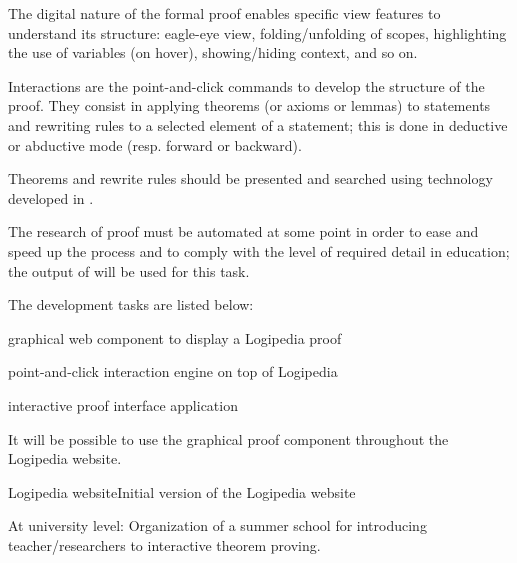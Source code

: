 \begin{workpackage}[id=dissemination,wphases=0-48,type=MGT,
  short=Dissemination,%
  title={Dissemination, communication and exploitation},
  lead=Inr]
\begin{tasklist}
\begin{task}[id=edukera,
      title=Web interface for doing proofs at school,
      lead=Edu,EduRM=12]
      The digital nature of the formal proof enables specific view features to
      understand its structure: eagle-eye view, folding/unfolding of scopes,
      highlighting the use of variables (on hover), showing/hiding context,
      and so on.

      Interactions are the point-and-click commands to develop the structure
      of the proof. They consist in applying theorems (or axioms or lemmas)
      to statements and rewriting rules to a selected element of a statement;
      this is done in deductive or abductive mode (resp. forward or backward).

      Theorems and rewrite rules should be presented and searched using
      technology developed in .

      The research of proof must be automated at some point in order to ease
      and speed up the process and to comply with the level of required detail
      in education; the output of  will be used for this task.

      The development tasks are listed below:
      \begin{compactitem}
      \item graphical web component to display a Logipedia proof
      \item point-and-click interaction engine on top of Logipedia
      \item interactive proof interface application
      \end{compactitem}

      It will be possible to use the graphical proof component throughout
      the Logipedia website.
  \end{task}

\end{tasklist}

\begin{wpdelivs}


  \begin{wpdeliv}[due=1,miles=startup,id=requirements,dissem=PU,nature=DEC,lead=Inr]{Logipedia website}Initial version of the Logipedia website
  \end{wpdeliv}


  \begin{wpdeliv}[due=18,miles=???,id=summerschool,dissem=PU,nature=other,lead=Str]{At university level: Organization of a summer school for introducing teacher/researchers to interactive theorem proving.}
  \end{wpdeliv}


\end{wpdelivs}
\end{workpackage}
